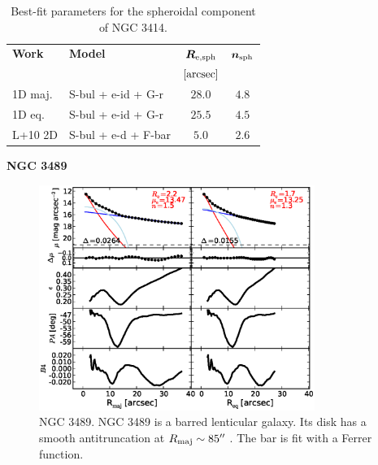 \documentclass[preprint2]{emulateapj}
\newcommand{\fitfigurewidth}{0.8\textwidth}
\begin{document}
  \begin{table}[h]
  \small
  \caption{Best-fit parameters for the spheroidal component of NGC 3414.}
  \begin{center}
  \begin{tabular}{llcc}
  \hline
  {\bf Work} & {\bf Model}   & $\bm R_{\rm e,sph}$    & $\bm n_{\rm sph}$ \\
    &  &  $[\rm arcsec]$ & \\
  \hline
  1D maj. & S-bul + e-id + G-r & $28.0$  &  $4.8$ \\
  1D eq.  & S-bul + e-id + G-r & $25.5$  &  $4.5$ \\
  \hline
  L+10 2D         & S-bul + e-d + F-bar	  & $5.0$  &  $2.6$ \\
  \hline
  \end{tabular}
  \end{center}
  \label{tab:n3414}
  \end{table}


  \clearpage\newpage\noindent
  {\bf NGC 3489 \\}

  \begin{figure}[h]
  \begin{center}
  \includegraphics[width=\fitfigurewidth]{images/n3489_1Dfit.eps}
  \caption{NGC 3489.
  NGC 3489 is a barred lenticular galaxy. 
  Its disk has a smooth antitruncation at $R_{\rm maj} \sim 85''$ \citep{erwin2008}.
  The bar is fit with a Ferrer function.
  }
  \end{center}
  \end{figure}
\end{document}

